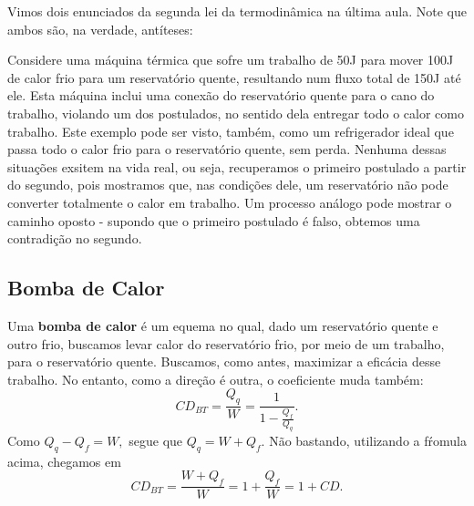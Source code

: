 \documentclass[phsyicsII_notes.tex]{subfiles}
\begin{document}
Vimos dois enunciados da segunda lei da termodinâmica na última aula. Note que ambos são, na verdade,
antíteses:

Considere uma máquina térmica que sofre um trabalho de 50J para mover 100J de calor frio para um reservatório quente, resultando
num fluxo total de 150J até ele. Esta máquina inclui uma conexão do reservatório quente para o cano do trabalho, violando um dos postulados,
no sentido dela entregar todo o calor como trabalho. Este exemplo pode ser visto, também, como um refrigerador ideal que passa todo o calor
frio para o reservatório quente, sem perda. Nenhuma dessas situações exsitem na vida real, ou seja, recuperamos o primeiro postulado a partir do segundo,
pois mostramos que, nas condições dele, um reservatório não pode converter totalmente o calor em trabalho.
Um processo análogo pode mostrar o caminho oposto - supondo que o primeiro postulado é falso, obtemos uma contradição no segundo.
\subsection{Bomba de Calor}
Uma \textbf{bomba de calor} é um equema no qual, dado um reservatório quente e outro frio, buscamos levar calor do reservatório frio, por meio de um trabalho, para o reservatório quente.
Buscamos, como antes, maximizar a eficácia desse trabalho. No entanto, como a direção é outra, o coeficiente muda também:
\[
	\boxed{CD_{BT} = \frac{Q_{q}}{W} = \frac{1}{1-\frac{Q_{f}}{Q_{q}}}}.
\]
Como \(Q_{q} - Q_{f} = W,\) segue que \(Q_{q} = W + Q_{f}\). Não bastando, utilizando a fŕomula acima, chegamos em
\[
	CD_{BT} = \frac{W+Q_{f}}{W} = 1 + \frac{Q_{f}}{W} = 1 + CD.
\]
\end{document}

